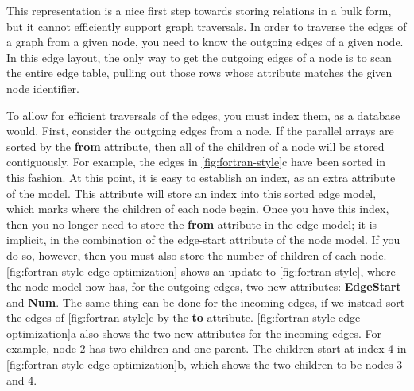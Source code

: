 This representation is a nice first step towards storing relations in a bulk
form, but it cannot efficiently support graph traversals. In order to traverse
the edges of a graph from a given node, you need to know the outgoing edges of a
given node.
In this edge layout, the only way to get the outgoing edges of a node is to scan
the entire edge table, pulling out those rows whose  attribute
matches the given node identifier.

To allow for efficient traversals of the edges, you must index them, as a
database would. First, consider the outgoing edges from a node. If the
 parallel arrays are sorted by the \textbf{from} attribute, then
all of the children of a node will be stored contiguously. For example, the
edges in \autoref{fig:fortran-style}c have been sorted in this fashion.
At this point, it is
easy to establish an index, as an extra attribute of the  model.
This attribute will store an index into this sorted edge model, which marks where the
children of each node begin. Once you have this index, then you no longer need to
store the \textbf{from} attribute in the edge model; it is implicit, in the
combination of the edge-start attribute of the node model. If you do so,
however, then you must also store the number of children of each node. 
\autoref{fig:fortran-style-edge-optimization} shows an update to
\autoref{fig:fortran-style}, where the node model now has, for the outgoing
edges, two new attributes: \textbf{EdgeStart} and \textbf{Num}. The same thing
can be done for the incoming edges, if we instead sort the edges of 
\autoref{fig:fortran-style}c by the \textbf{to} attribute.
\autoref{fig:fortran-style-edge-optimization}a also shows the two new attributes
for the incoming edges.  For example, node 2 has two children and
one parent. The children start at index 4 in
\autoref{fig:fortran-style-edge-optimization}b, which shows the two children to
be nodes 3 and 4.

